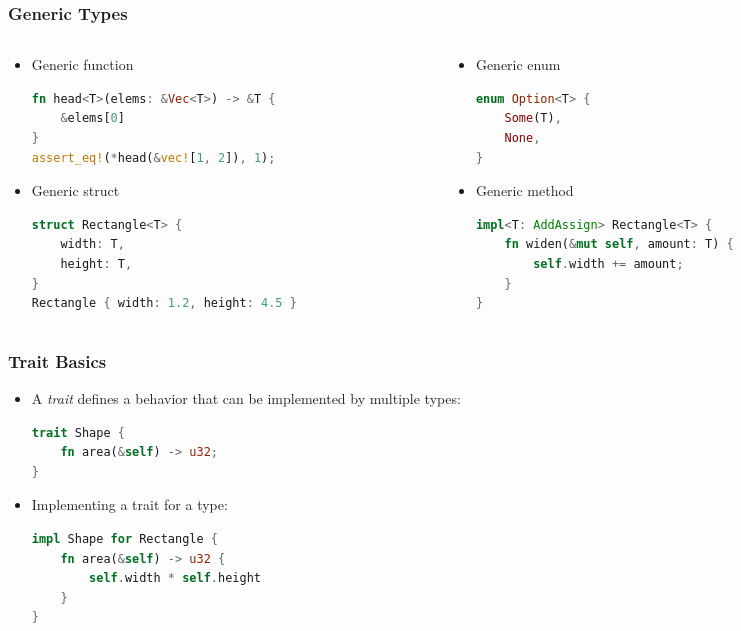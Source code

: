 \begin{frame}[fragile]
    \frametitle{Generic Types}

    \begin{columns}
    \begin{column}{0.5\textwidth}

    \begin{itemize}
        \item<1-> Generic function
        \begin{lstlisting}[language=rust]
fn head<T>(elems: &Vec<T>) -> &T {
    &elems[0]
}
assert_eq!(*head(&vec![1, 2]), 1);
        \end{lstlisting}

        \item<2-> Generic struct
        \begin{lstlisting}[language=rust]
struct Rectangle<T> {
    width: T,
    height: T,
}
Rectangle { width: 1.2, height: 4.5 }
        \end{lstlisting}
    \end{itemize}

    \end{column}
    \begin{column}{0.5\textwidth}

    \begin{itemize}
        \item<3-> Generic enum
        \begin{lstlisting}[language=rust]
enum Option<T> {
    Some(T),
    None,
}
        \end{lstlisting}

        \item<4-> Generic method
        \begin{lstlisting}[language=rust]
impl<T: AddAssign> Rectangle<T> {
    fn widen(&mut self, amount: T) {
        self.width += amount;
    }
}
        \end{lstlisting}
    \end{itemize}

    \end{column}
    \end{columns}
\end{frame}

\begin{frame}[fragile]
    \frametitle{Trait Basics}

    \begin{itemize}
        \item A \emph{trait} defines a behavior that can be implemented by multiple types:
        \begin{lstlisting}[language=rust]
trait Shape {
    fn area(&self) -> u32;
}
        \end{lstlisting}

        \pause

        \item Implementing a trait for a type:
        \begin{lstlisting}[language=rust]
impl Shape for Rectangle {
    fn area(&self) -> u32 {
        self.width * self.height
    }
}
        \end{lstlisting}
    \end{itemize}
\end{frame}

